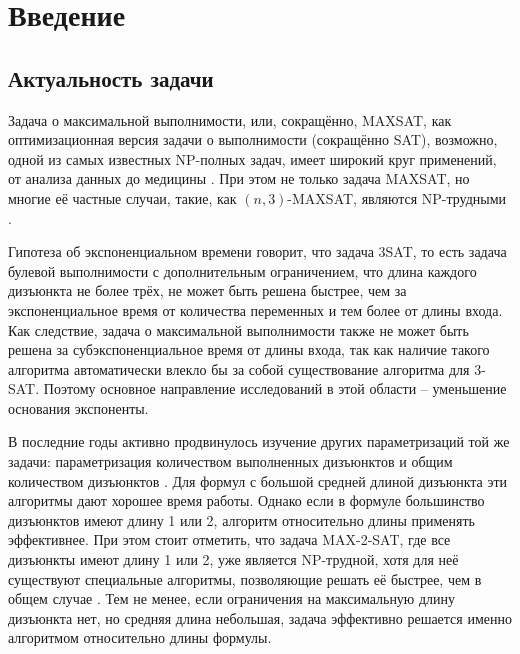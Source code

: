 
\section*{Введение}
\label{sec:intro}

\subsection*{Актуальность задачи}

\firstpar{}Задача о максимальной выполнимости, или, сокращённо, MAXSAT, как оптимизационная версия задачи о выполнимости (сокращённо SAT), возможно, одной из самых известных NP-полных задач, имеет широкий круг применений, от анализа данных \cite{berg2015applications} до медицины \cite{lin2012application}.
При этом не только задача MAXSAT, но многие её частные случаи, такие, как $(n,3)$-MAXSAT, являются NP-трудными \cite{raman1998simplified}.

Гипотеза об экспоненциальном времени говорит, что задача 3SAT, то есть задача булевой выполнимости с дополнительным ограничением, что длина каждого дизъюнкта не более трёх, не может быть решена быстрее, чем за экспоненциальное время от количества переменных и тем более от длины входа. Как следствие, задача о максимальной выполнимости также не может быть решена за субэкспоненциальное время от длины входа, так как наличие такого алгоритма автоматически влекло бы за собой существование алгоритма для 3-SAT. Поэтому основное направление исследований в этой области -- уменьшение основания экспоненты.

В последние годы активно продвинулось изучение других параметризаций той же задачи: параметризация количеством выполненных дизъюнктов \cite{chen15} и общим количеством дизъюнктов \cite{xu19}. Для формул с большой средней длиной дизъюнкта эти алгоритмы дают хорошее время работы. Однако если в формуле большинство дизъюнктов имеют длину 1 или 2, алгоритм относительно длины применять эффективнее. При этом стоит отметить, что задача MAX-2-SAT, где все дизъюнкты имеют длину 1 или 2, уже является NP-трудной, хотя для неё существуют специальные алгоритмы, позволяющие решать её быстрее, чем в общем случае \cite{golovnev2014new}. Тем не менее, если ограничения на максимальную длину дизъюнкта нет, но средняя длина небольшая, задача эффективно решается именно алгоритмом относительно длины формулы.

